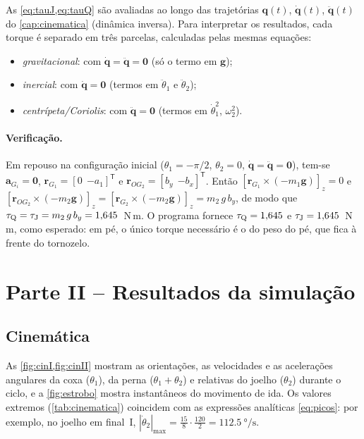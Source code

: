 \documentclass[12pt,a4paper,twoside]{article}
\numberwithin{equation}{section}
\begin{document}
As \cref{eq:tauJ,eq:tauQ} são avaliadas ao longo das trajetórias
$\mathbf q(t)$, $\dot{\mathbf q}(t)$, $\ddot{\mathbf q}(t)$ do \cref{cap:cinematica} (dinâmica inversa). Para
interpretar os resultados, cada torque é separado em três parcelas, calculadas pelas mesmas
equações:
\begin{itemize}
  \item \emph{gravitacional}: com $\dot{\mathbf q} = \ddot{\mathbf q} = \mathbf 0$ (só o termo em $\mathbf g$);
  \item \emph{inercial}: com $\dot{\mathbf q} = \mathbf 0$ (termos em $\ddot\theta_1$ e $\ddot\theta_2$);
  \item \emph{centrípeta/Coriolis}: com $\ddot{\mathbf q} = \mathbf 0$ (termos em $\dot\theta_1^2$, $\omega_2^2$).
\end{itemize}

\paragraph{Verificação.} Em repouso na configuração inicial ($\theta_1 = -\pi/2$,
$\theta_2 = 0$, $\dot{\mathbf q} = \ddot{\mathbf q} = \mathbf 0$), tem-se $\mathbf a_{G_i} = \mathbf 0$,
$\mathbf r_{G_1} = [0\ \ {-a_1}]^{\mathsf T}$ e $\mathbf r_{OG_2} = [b_y\ \ {-b_x}]^{\mathsf T}$. Então
$[\mathbf r_{G_1}\times(-m_1\mathbf g)]_z = 0$ e
$[\mathbf r_{OG_2}\times(-m_2\mathbf g)]_z = [\mathbf r_{G_2}\times(-m_2\mathbf g)]_z = m_2\,g\,b_y$, de modo que
$\tau_{\mathrm Q} = \tau_{\mathrm J} = m_2\,g\,b_y = 1{,}645$~N\,m. O programa fornece
$\tau_{\mathrm Q} = 1{,}645$ e $\tau_{\mathrm J} = 1{,}645$~N\,m, como esperado: em pé, o único torque
necessário é o do peso do pé, que fica à frente do tornozelo.

\section{Parte II -- Resultados da simulação}\label{cap:resultados2}

\subsection{Cinemática}

As \cref{fig:cinI,fig:cinII} mostram as orientações, as velocidades e as acelerações
angulares da coxa ($\theta_1$), da perna ($\theta_1+\theta_2$) e relativas do joelho ($\theta_2$)
durante o ciclo, e a \cref{fig:estrobo} mostra instantâneos do movimento de ida. Os
valores extremos (\cref{tab:cinematica}) coincidem com as expressões analíticas
\eqref{eq:picos}: por exemplo, no joelho em final~I,
$|\dot\theta_2|_{\max} = \frac{15}{8}\cdot\frac{120}{2} = \SI{112,5}{\degree\per\s}$.
\end{document}
